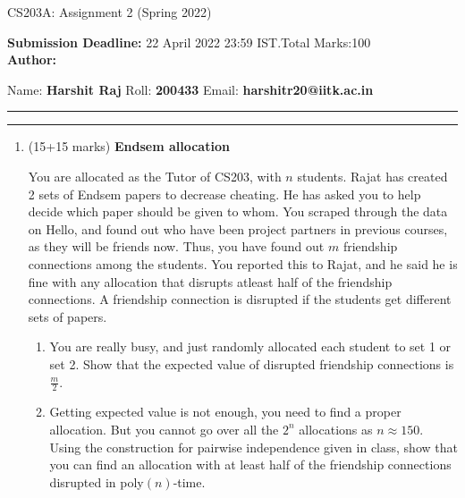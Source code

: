 \documentclass[10pt]{article}
\begin{document}
\begin{center}
    \huge{CS203A: Assignment 2 (Spring 2022)}
\end{center}

\textbf{Submission Deadline:} 22 April 2022 23:59 IST.\hfill Total Marks:100\\

\textbf{Author:}
\begin{itemize}
    Name: \textbf{Harshit Raj} \hfill
    Roll: \textbf{200433} \hfill 
    Email: \textbf{harshitr20@iitk.ac.in}
\end{itemize}

\hrule
\hrule
\begin{enumerate}

\item (15+15 marks) \textbf{Endsem allocation}

You are allocated as the Tutor of CS203, with $n$ students. Rajat has created 2 sets of Endsem papers to decrease cheating. He has asked you to help decide which paper should be given to whom. You scraped through the data on Hello, and found out who have been project partners in previous courses, as they will be friends now. Thus, you have found out $m$ friendship connections among the students. You reported this to Rajat, and he said he is fine with any allocation that disrupts atleast half of the friendship connections. A friendship connection is disrupted if the students get different sets of papers.

\begin{enumerate}

\item You are really busy, and just randomly allocated each student to set 1 or set 2. Show that the expected value of disrupted friendship connections is $\frac{m}{2}$.

\item Getting expected value is not enough, you need to find a proper allocation. But you cannot go over all the $2^n$ allocations as $n\approx 150$. Using the construction for pairwise independence given in class, show that you can find an allocation with at least half of the friendship connections disrupted in poly$(n)$-time.

\end{enumerate}


\end{enumerate}
\end{document}
